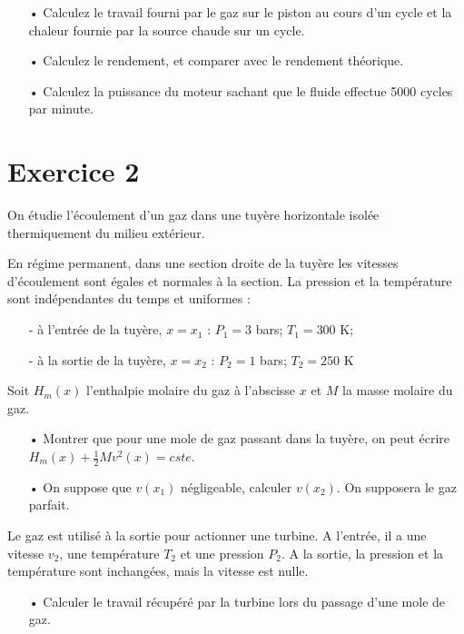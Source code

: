 \documentclass{report}
\begin{document}
\begin{itemize}
\item[•] Calculez le travail fourni par le gaz sur le piston au cours d'un cycle et la chaleur fournie par la source chaude sur un cycle.
\item[•] Calculez le rendement, et comparer avec le rendement théorique.
\item[•] Calculez la puissance du moteur sachant que le fluide effectue 5000 cycles par minute. 
\end{itemize}

\newpage

\section*{Exercice 2}

On étudie l'écoulement d'un gaz dans une tuyère horizontale isolée thermiquement du milieu extérieur.

En régime permanent, dans une section droite de la tuyère les vitesses d'écoulement sont égales et normales à la section. La pression et la température sont indépendantes du temps et uniformes :
\begin{itemize}
\item[-]à l'entrée de la tuyère, $x=x_{1}$ : $P_{1} = 3$ bars; $T_{1} = 300$ K;
\item[-]à la sortie de la tuyère, $x=x_{2}$ : $P_{2} = 1$ bars; $T_{2} = 250$ K
\end{itemize}

Soit $H_{m}(x)$ l'enthalpie molaire du gaz à l'abscisse $x$ et $M$ la masse molaire du gaz. 

\begin{itemize}
\item[•] Montrer que pour une mole de gaz passant dans la tuyère, on peut écrire $H_{m}(x)+\frac{1}{2}Mv^{2}(x)= cste$.
\item[•] On suppose que $v(x_{1})$ négligeable, calculer $v(x_{2})$. On supposera le gaz parfait. 
\end{itemize}
Le gaz est utilisé à la sortie pour actionner une turbine. A l'entrée, il a une vitesse $v_{2}$, une température $T_{2}$ et une pression $P_{2}$. A la sortie, la pression et la température sont inchangées, mais la vitesse est nulle. 
\begin{itemize}
\item[•] Calculer le travail récupéré par la turbine lors du passage d'une mole de gaz.

\end{itemize}
\end{document}
